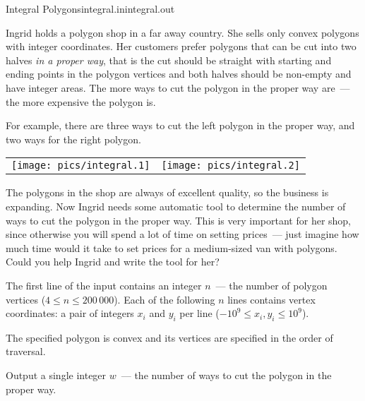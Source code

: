 \begin{problem}{Integral Polygons}{integral.in}{integral.out}{\timeLimit}


Ingrid holds a polygon shop in a far away country. She sells only convex
polygons with integer coordinates. Her customers
prefer polygons that can be cut into two halves \emph{in a proper way}, that is
the cut should be straight with starting and ending points in the polygon vertices
and both halves should be non-empty and have integer areas.
The more ways to cut the polygon in the proper way are~--- the more expensive the polygon is.

For example, there are three ways to cut the left polygon in the proper way,
and two ways for the right polygon.

\begin{center}
\begin{tabular}{cc}
    \texttt{[image: pics/integral.1]} &
    \texttt{[image: pics/integral.2]}
\end{tabular}
\end{center}

The polygons in the shop are always of excellent quality, so the business is expanding.
Now Ingrid needs some automatic tool to determine the number of ways to cut
the polygon in the proper way. This is very important for her shop, since otherwise you
will spend a lot of time on setting prices~--- just imagine how
much time would it take to set prices for a medium-sized van with polygons. 
Could you help Ingrid and write the tool for her?

\InputFile

The first line of the input contains an integer $n$~---
the number of polygon vertices ($4 \leq n \leq 200\,000$).
Each of the following $n$ lines contains vertex coordinates: 
a pair of integers $x_i$ and $y_i$ per line ($-10^9 \le x_i, y_i \le 10^9$).

The specified polygon is convex and its vertices are specified in the order of traversal.

\OutputFile

Output a single integer $w$~--- the number of ways to cut the polygon in the proper way.

\Example

\begin{example}
%
%
\end{example}

\end{problem}

